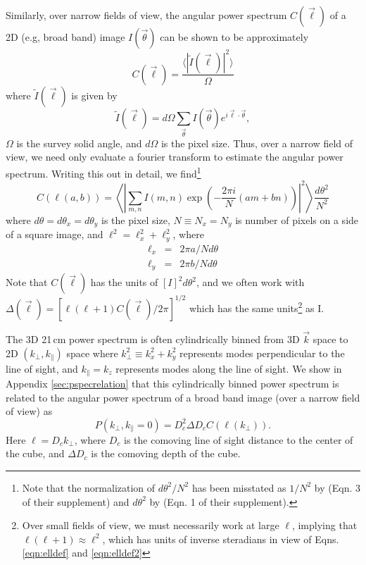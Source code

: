 \documentclass{emulateapj}
\begin{document}
Similarly, over narrow fields of view, the angular power spectrum $C(\vec{\ell})$ of a 2D (e.g, broad band) image $I(\vec{\theta})$ can be shown to be approximately
\begin{equation}
\label{eqn:Cldef0}
	C(\vec{\ell}) = \frac{\langle|\tilde{I}(\vec{\ell})|^2\rangle}{\Omega} 
\end{equation}
where $\tilde{I}(\vec{\ell})$ is given by
\begin{equation}
	\tilde{I}(\vec{\ell})=d\Omega\sum_{\vec{\theta}}I(\vec{\theta})e^{i\vec{\ell}\cdot\vec{\theta}},
\end{equation}
$\Omega$ is the survey solid angle, and $d\Omega$ is the pixel size. Thus, over a narrow field of view, we need only evaluate a fourier transform to estimate the angular power spectrum. Writing this out in detail, we find\footnote{Note that the normalization of $d\theta^2/N^2$ has been misstated as $1/N^2$ by \citet{zemcov14} (Eqn. 3 of their supplement) and $d\theta^2$ by \citet{cooray12} (Eqn. 1 of their supplement).} 
\begin{equation}
\label{eqn:Cldef}
	C(\ell(a,b))=\left\langle\left|\sum_{m,n}I(m,n)\exp\left(-\frac{2\pi i}{N}  (am+bn)\right)\right|^2\right\rangle\frac{d\theta^2}{N^2}
\end{equation}
where $d\theta=d\theta_x=d\theta_y$ is the pixel size, $N\equiv N_x=N_y$ is number of pixels on a side of a square image, and $\ell^2=\ell_x^2+\ell_y^2$, where 
\begin{eqnarray}
\ell_x&=&2\pi a/N d\theta \label{eqn:elldef}\\
\ell_y&=&2\pi b/Nd\theta \label{eqn:elldef2}
\end{eqnarray}
Note that $C(\vec{\ell})$ has the units of $[I]^2d\theta^2$, and we often work with $\Delta(\vec{\ell})=[\ell(\ell+1)C(\vec{\ell})/2\pi]^{1/2}$ which has the same units\footnote{Over small fields of view, we must necessarily work at large $\ell$, implying that $\ell(\ell+1)\approx\ell^2$, which has units of inverse steradians in view of Eqns. \ref{eqn:elldef} and \ref{eqn:elldef2}} as I.

The 3D 21\,cm power spectrum is often cylindrically binned from 3D $\vec{k}$ space to 2D $(k_\perp,k_\parallel)$ space where $k_\perp^2\equiv k_x^2+k_y^2$ represents modes perpendicular to the line of sight, and $k_\parallel=k_z$ represents modes along the line of sight. We show in Appendix \ref{sec:pspecrelation} that this cylindrically binned power spectrum is related to the angular power spectrum of a broad band image (over a narrow field of view) as
\begin{equation}
P(k_\perp,k_\parallel=0)=D_c^2 \Delta D_c C(\ell(k_\perp)).
\end{equation}
Here $\ell=D_c k_\perp$, where $D_c$ is the comoving line of sight distance to the center of the cube, and $\Delta D_c$ is the comoving depth of the cube.
\end{document}
